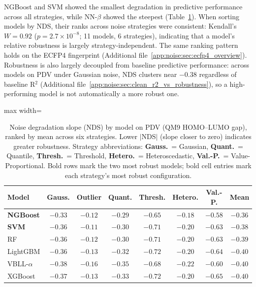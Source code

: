 NGBoost and SVM showed the smallest degradation in predictive performance across all strategies, while NN-$\beta$ showed the steepest (Table~\ref{tab:nds_ranking}). When sorting models by NDS, their ranks across noise strategies were consistent: Kendall's $W = 0.92$ ($p = 2.7 \times 10^{-8}$; 11 models, 6 strategies), indicating that a model's relative robustness is largely strategy-independent. The same ranking pattern holds on the ECFP4 fingerprint (Additional file~\ref{app:noise:sec:ecfp4_overview}). Robustness is also largely decoupled from baseline predictive performance: across models on PDV under Gaussian noise, NDS clusters near $-0.38$ regardless of baseline R$^2$ (Additional file~\ref{app:noise:sec:clean_r2_vs_robustness}), so a high-performing model is not automatically a more robust one.

\begin{table}[htbp]
\centering
\caption[Noise degradation slope by model on PDV, QM9.]{Noise degradation slope (NDS) by model on PDV (QM9 HOMO--LUMO gap), ranked by mean across six strategies. Lower $|$NDS$|$ (slope closer to zero) indicates greater robustness. Strategy abbreviations: \textbf{Gauss.}\ = Gaussian, \textbf{Quant.}\ = Quantile, \textbf{Thresh.}\ = Threshold, \textbf{Hetero.}\ = Heteroscedastic, \textbf{Val.-P.}\ = Value-Proportional. Bold rows mark the two most robust models; bold cell entries mark each strategy's most robust configuration.}
\label{tab:nds_ranking}
\small
\begin{adjustbox}{max width=\textwidth}
\begin{tabular}{lccccccc}
\toprule
\textbf{Model} & \textbf{Gauss.} & \textbf{Outlier} & \textbf{Quant.} & \textbf{Thresh.} & \textbf{Hetero.} & \textbf{Val.-P.} & \textbf{Mean} \\
\midrule
\textbf{NGBoost}    & $\mathbf{-0.33}$ & $-0.12$ & $\mathbf{-0.29}$ & $\mathbf{-0.65}$ & $\mathbf{-0.18}$ & $\mathbf{-0.58}$ & $\mathbf{-0.36}$ \\
\textbf{SVM}        & $-0.36$ & $\mathbf{-0.11}$ & $-0.30$ & $-0.71$ & $-0.20$ & $-0.63$ & $-0.38$ \\
RF                  & $-0.36$ & $-0.12$ & $-0.30$ & $-0.71$ & $-0.20$ & $-0.63$ & $-0.39$ \\
LightGBM            & $-0.36$ & $-0.13$ & $-0.32$ & $-0.72$ & $-0.20$ & $-0.64$ & $-0.40$ \\
VBLL-$\alpha$       & $-0.38$ & $-0.16$ & $-0.35$ & $-0.68$ & $-0.22$ & $-0.60$ & $-0.40$ \\
XGBoost             & $-0.37$ & $-0.13$ & $-0.33$ & $-0.72$ & $-0.20$ & $-0.65$ & $-0.40$ \\

\end{tabular}
\end{adjustbox}
\end{table}
